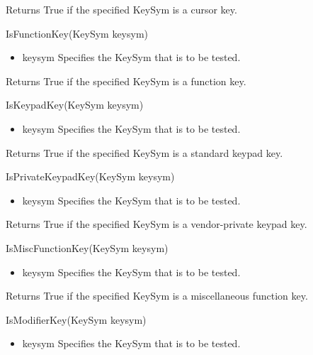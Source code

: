 \documentclass{report}
\begin{document}
\begin{itemize}
\begin{itemize}
\begin{itemize}
            \end{itemize}
            Returns True if the specified KeySym is a cursor key.
            \bigbreak \noindent 
            \begin{cppcode}
                IsFunctionKey(KeySym keysym)
            \end{cppcode}
            \begin{itemize}
                \item keysym Specifies the KeySym that is to be tested.
            \end{itemize}
            Returns True if the specified KeySym is a function key.
            \bigbreak \noindent 
            \begin{cppcode}
                IsKeypadKey(KeySym keysym)
            \end{cppcode}
            \begin{itemize}
                \item keysym Specifies the KeySym that is to be tested.
            \end{itemize}
            Returns True if the specified KeySym is a standard keypad key.
            \bigbreak \noindent 
            \begin{cppcode}
                IsPrivateKeypadKey(KeySym keysym)
            \end{cppcode}
            \begin{itemize}
                \item keysym Specifies the KeySym that is to be tested.
            \end{itemize}
            Returns True if the specified KeySym is a vendor-private keypad key.
            \bigbreak \noindent 
            \begin{cppcode}
                IsMiscFunctionKey(KeySym keysym)
            \end{cppcode}
            \begin{itemize}
                \item keysym Specifies the KeySym that is to be tested.
            \end{itemize}
            Returns True if the specified KeySym is a miscellaneous function key.
            \bigbreak \noindent 
            \begin{cppcode}
                IsModifierKey(KeySym keysym)
            \end{cppcode}
            \begin{itemize}
                \item keysym Specifies the KeySym that is to be tested.

\end{itemize}
\end{itemize}
\end{itemize}
\end{document}
